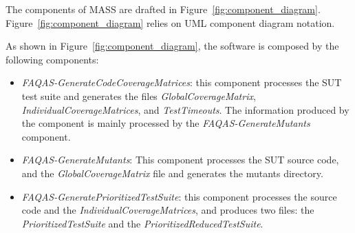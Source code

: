 The components of MASS are drafted in Figure~\ref{fig:component_diagram}. Figure~\ref{fig:component_diagram} relies on UML component diagram notation.

As shown in Figure~\ref{fig:component_diagram}, the software is composed by the following components:

\begin{itemize}
	\item \textit{FAQAS-GenerateCodeCoverageMatrices}: this component processes the SUT test suite and generates the files \textit{GlobalCoverageMatrix}, \textit{IndividualCoverageMatrices}, and \textit{TestTimeouts}. The information produced by the component is mainly processed by the \textit{FAQAS-GenerateMutants} component.

	\item \textit{FAQAS-GenerateMutants}: This component processes the SUT source code, and the \textit{GlobalCoverageMatrix} file and generates the mutants directory.

	\item \textit{FAQAS-GeneratePrioritizedTestSuite}: this component processes the source code and the \textit{IndividualCoverageMatrices}, and produces two files: the \textit{PrioritizedTestSuite} and the \textit{PrioritizedReducedTestSuite}.


\end{itemize}
